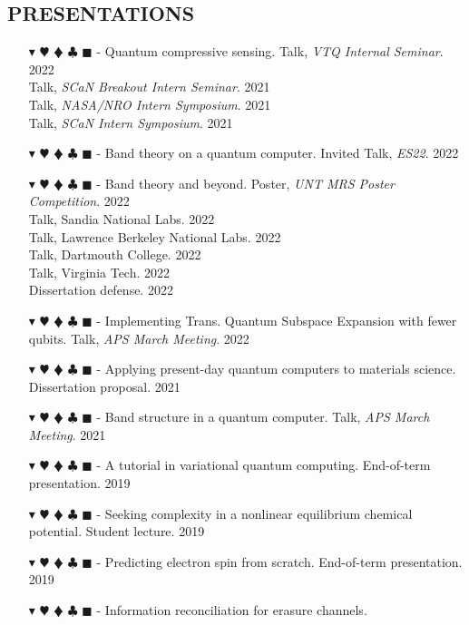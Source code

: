 \documentclass[overlapped, 10pt]{res} %
\newcommand{\physics}{$\blacktriangledown$}
\newcommand{\biochem}{$\varheartsuit$}
\newcommand{\shannon}{$\vardiamondsuit$}
\newcommand{\classic}{$\clubsuit$}
\newcommand{\quantum}{$\blacksquare$}
\newcommand{\physicscolor}{\color{YellowOrange}}
\newcommand{\biochemcolor}{\color{Emerald}}
\newcommand{\shannoncolor}{\color{Goldenrod}}
\newcommand{\classiccolor}{\color{Cyan}}
\newcommand{\quantumcolor}{\color{RedOrange}}
\newcommand{\tag}[1]{
    {\IfSubStr{#1}{\physics}{\physicscolor}{\color{White}}\physics}
    {\IfSubStr{#1}{\biochem}{\biochemcolor}{\color{White}}\biochem}
    {\IfSubStr{#1}{\shannon}{\shannoncolor}{\color{White}}\shannon}
    {\IfSubStr{#1}{\classic}{\classiccolor}{\color{White}}\classic}
    {\IfSubStr{#1}{\quantum}{\quantumcolor}{\color{White}}\quantum}
}
\begin{document}
\begin{resume}
\section{PRESENTATIONS}
\begin{itemize} \itemsep -2pt %
\item[\tag{\shannon\quantum}-] Quantum compressive sensing.
    \hfill Talk, \textit{VTQ Internal Seminar}. 2022
    \\ \null \hfill Talk, \textit{SCaN Breakout Intern Seminar}. 2021
    \\ \null \hfill Talk, \textit{NASA/NRO Intern Symposium}. 2021
    \\ \null \hfill Talk, \textit{SCaN Intern Symposium}. 2021
\item[\tag{\physics\quantum}-] Band theory on a quantum computer.
    \hfill Invited Talk, \textit{ES22}. 2022
\item[\tag{\physics\biochem\shannon\quantum}-] Band theory and beyond.
    \hfill Poster, \textit{UNT MRS Poster Competition}. 2022
    \\ \null \hfill Talk, Sandia National Labs. 2022
    \\ \null \hfill Talk, Lawrence Berkeley National Labs. 2022
    \\ \null \hfill Talk, Dartmouth College. 2022
    \\ \null \hfill Talk, Virginia Tech. 2022
    \\ \null \hfill Dissertation defense. 2022
\item[\tag{\physics\quantum}-] Implementing Trans. Quantum Subspace Expansion with fewer qubits.
    \hfill Talk, \textit{APS March Meeting}. 2022
\item[\tag{\physics\biochem\quantum}-] Applying present-day quantum computers to materials science.
    \hfill Dissertation proposal. 2021
\item[\tag{\physics\quantum}-] Band structure in a quantum computer.
    \hfill Talk, \textit{APS March Meeting}. 2021
\item[\tag{\physics\quantum}-] A tutorial in variational quantum computing.
    \hfill End-of-term presentation. 2019
\item[\tag{\biochem}-] Seeking complexity in a nonlinear equilibrium chemical potential.
    \hfill Student lecture. 2019
\item[\tag{\physics}-] Predicting electron spin from scratch.
    \hfill End-of-term presentation. 2019
\item[\tag{\shannon\classic}-] Information reconciliation for erasure channels.

\end{itemize}
\end{resume}
\end{document}
